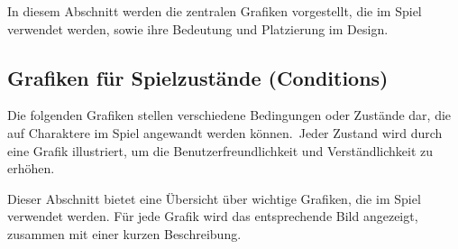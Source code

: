 In diesem Abschnitt werden die zentralen Grafiken vorgestellt, die im Spiel verwendet werden, sowie ihre Bedeutung
und Platzierung im Design.

\subsection{Grafiken für Spielzustände (Conditions)}
Die folgenden Grafiken stellen verschiedene Bedingungen oder Zustände dar, die auf Charaktere im Spiel angewandt werden
können.\ Jeder Zustand wird durch eine Grafik illustriert, um die Benutzerfreundlichkeit und Verständlichkeit zu erhöhen.

Dieser Abschnitt bietet eine Übersicht über wichtige Grafiken, die im Spiel verwendet werden.
Für jede Grafik wird das entsprechende Bild angezeigt, zusammen mit einer kurzen Beschreibung.

